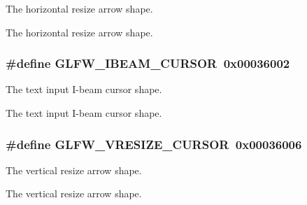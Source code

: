 The horizontal resize arrow shape. 

The horizontal resize arrow shape. \hypertarget{group__shapes_g36185f4375eaada1b04e431244774c86}{
\subsubsection[GLFW\_\-IBEAM\_\-CURSOR]{\setlength{\rightskip}{0pt plus 5cm}\#define GLFW\_\-IBEAM\_\-CURSOR~0x00036002}}
\label{group__shapes_g36185f4375eaada1b04e431244774c86}


The text input I-beam cursor shape. 

The text input I-beam cursor shape. \hypertarget{group__shapes_gf024f0e1ff8366fb2b5c260509a1fce5}{
\subsubsection[GLFW\_\-VRESIZE\_\-CURSOR]{\setlength{\rightskip}{0pt plus 5cm}\#define GLFW\_\-VRESIZE\_\-CURSOR~0x00036006}}
\label{group__shapes_gf024f0e1ff8366fb2b5c260509a1fce5}


The vertical resize arrow shape. 

The vertical resize arrow shape. 